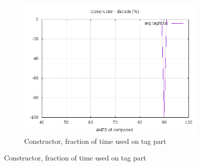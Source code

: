 \documentclass[10pt,a4paper]{article}
\begin{document}
\begin{figure}[h]
\begin{subfigure}[t]{0.3\textwidth}
        \includegraphics[width=\textwidth]{const_decode_frac}
        \caption{Constructor, fraction of time used on tag part}
    \end{subfigure}


\end{figure}
\end{document}
